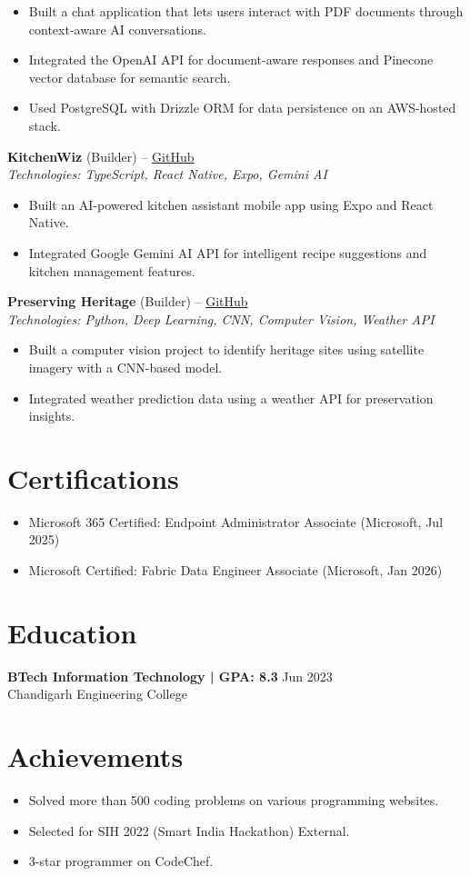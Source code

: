 \documentclass[11pt,a4paper]{article}
\begin{document}
\begin{itemize}
  \item Built a chat application that lets users interact with PDF documents through context-aware AI conversations.
  \item Integrated the OpenAI API for document-aware responses and Pinecone vector database for semantic search.
  \item Used PostgreSQL with Drizzle ORM for data persistence on an AWS-hosted stack.
\end{itemize}
\vspace{2pt}
\textbf{KitchenWiz} (Builder) -- \href{https://github.com/Arihant1208/KitchenWiz-expo}{GitHub}
\\ \textit{Technologies: TypeScript, React Native, Expo, Gemini AI}
\begin{itemize}
  \item Built an AI-powered kitchen assistant mobile app using Expo and React Native.
  \item Integrated Google Gemini AI API for intelligent recipe suggestions and kitchen management features.
\end{itemize}
\vspace{2pt}
\textbf{Preserving Heritage} (Builder) -- \href{https://github.com/Arihant1208/PRESERVING-MONUMENTS}{GitHub}
\\ \textit{Technologies: Python, Deep Learning, CNN, Computer Vision, Weather API}
\begin{itemize}
  \item Built a computer vision project to identify heritage sites using satellite imagery with a CNN-based model.
  \item Integrated weather prediction data using a weather API for preservation insights.
\end{itemize}
\vspace{2pt}

\section{Certifications}
\begin{itemize}
  \item Microsoft 365 Certified: Endpoint Administrator Associate (Microsoft, Jul 2025)
  \item Microsoft Certified: Fabric Data Engineer Associate (Microsoft, Jan 2026)
\end{itemize}

\section{Education}
\textbf{BTech Information Technology | GPA: 8.3} \hfill Jun 2023
\\ Chandigarh Engineering College
\vspace{2pt}

\section{Achievements}
\begin{itemize}
  \item Solved more than 500 coding problems on various programming websites.
  \item Selected for SIH 2022 (Smart India Hackathon) External.
  \item 3-star programmer on CodeChef.
\end{itemize}
\end{document}
